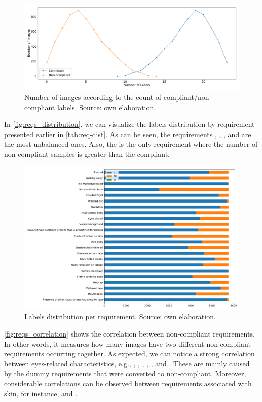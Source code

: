\begin{figure}
\centering
\includegraphics[width=\linewidth]{images/labels_by_sample.pdf}
\caption{Number of images according to the count of compliant/non-compliant labels. Source: own elaboration.}
\label{fig:labels_by_sample}
\end{figure}

In \autoref{fig:reqs_distribution}, we can visualize the labels distribution by requirement presented earlier in \autoref{tab:req-dist}. As can be seen, the requirements \inkmarked, \washedout, \framestooheavy, and \otherfacesortoys are the most unbalanced ones. Also, the \unnaturalskintone is the only requirement where the number of non-compliant samples is greater than the compliant.

\begin{figure}
\centering
\includegraphics[width=\linewidth]{images/reqs_distribution.pdf}
\caption{Labels distribution per requirement. Source: own elaboration.}
\label{fig:reqs_distribution}
\end{figure}

\autoref{fig:reqs_correlation} shows the correlation between non-compliant requirements. In other words, it measures how many images have two different non-compliant requirements occurring together. As expected, we can notice a strong correlation between eyes-related characteristics, e.g., \lookingaway, \hairacrosseyes, \eyesclosed, \redeyes, \darktintedlenses, and \framecoveringeyes. These are mainly caused by the dummy requirements that were converted to non-compliant. Moreover, considerable correlations can be observed between requirements associated with skin, for instance, \unnaturalskintone and \flashskin. 


